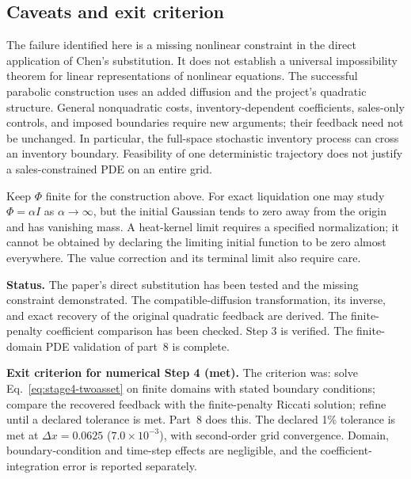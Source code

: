 \subsection*{Caveats and exit criterion}

The failure identified here is a missing nonlinear constraint in the
direct application of Chen's substitution. It does not establish a
universal impossibility theorem for linear representations of nonlinear
equations. The successful parabolic construction uses an added diffusion
and the project's quadratic structure. General nonquadratic costs,
inventory-dependent coefficients, sales-only controls, and imposed
boundaries require new arguments; their feedback need not be unchanged.
In particular, the full-space stochastic inventory process can cross an
inventory boundary. Feasibility of one deterministic trajectory does not
justify a sales-constrained PDE on an entire grid.

Keep $\Phi$ finite for the construction above. For exact liquidation one
may study $\Phi=\alpha I$ as $\alpha\to\infty$, but the initial Gaussian
tends to zero away from the origin and has vanishing mass. A heat-kernel
limit requires a specified normalization; it cannot be obtained by
declaring the limiting initial function to be zero almost everywhere.
The value correction and its terminal limit also require care.

\textbf{Status.} The paper's direct substitution has been tested and the
missing constraint demonstrated. The compatible-diffusion transformation,
its inverse, and exact recovery of the original quadratic feedback are
derived. The finite-penalty coefficient comparison has been checked.
Step 3 is verified. The finite-domain PDE validation of part~8 is
complete.

\textbf{Exit criterion for numerical Step 4 (met).} The criterion was:
solve Eq.~\eqref{eq:stage4-twoasset} on finite domains with stated boundary
conditions; compare the recovered feedback with the finite-penalty Riccati
solution; refine until a declared tolerance is met. Part~8 does this.
The declared 1\% tolerance is met at $\Delta x=0.0625$
($7.0\times10^{-3}$), with second-order grid convergence. Domain,
boundary-condition and time-step effects are negligible, and the
coefficient-integration error is reported separately.
